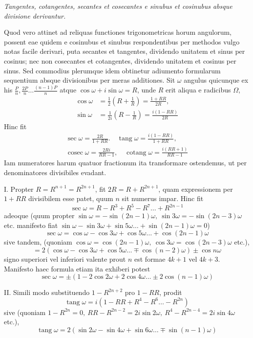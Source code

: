 \begin{center}\itshape \textit{Tangentes, cotangentes, secantes et cosecantes e sinubus et cosinubus absque divisione derivantur.}\end{center}


Quod vero attinet ad reliquas functiones trigonometricas horum angulorum, possent eae quidem e cosinubus et sinubus respondentibus per methodos vulgo notas facile derivari, puta secantes et tangentes, dividendo unitatem et sinus per cosinus; nec non cosecantes et cotangentes, dividendo unitatem et cosinus per sinus. Sed commodius plerumque idem obtinetur adiumento formularum sequentium absque divisionibus per meras additiones. Sit \(\omega\) angulus quicunque ex his \(\frac Pn,\allowbreak \frac{2P}n\ldots\frac{(n-1)P}n\) atque \(\cos\omega+i\sin\omega=R\), unde \(R\) erit aliqua e radicibus \(\Omega\), \[\begin{aligned}\cos\omega&=\tfrac12(R+\tfrac1R)=\frac{1+RR}{2R},\\\sin\omega&=\tfrac1{2i}(R-\tfrac1R)=\frac{i(1-RR)}{2R}\end{aligned}\] Hinc fit \[\begin{gathered}\sec\omega=\frac{2R}{1+RR}.\quad\operatorname{tang}\omega=\frac{i(1-RR)}{1+RR},\\\operatorname{cosec}\omega=\frac{2Ri}{RR-1},\quad\operatorname{cotang}\omega=\frac{i(RR+1)}{RR-1}\end{gathered}\] Iam numeratores harum quatuor fractionum ita transformare ostendemus, ut per denominatores divisibiles evadant.

I. Propter \(R=R^{n+1}=R^{2n+1}\), fit \(2R=R+R^{2n+1}\), quam expressionem per \(1+RR\) divisibilem esse patet, quum \(n\) sit numerus impar. Hinc fit \[\sec\omega=R-R^3+R^5-R^7\ldots+R^{2n-1}\] adeoque (quum propter \(\sin\omega=-\sin(2n-1)\omega,\allowbreak \ \sin3\omega=-\sin(2n-3)\omega\) etc. manifesto fiat \(\sin\omega-\sin3\omega+\sin5\omega\ldots+\sin(2n-1)\omega=0\)) \[\sec\omega=\cos\omega-\cos3\omega+\cos5\omega\ldots+\cos(2n-1)\omega\] sive tandem, (quoniam \(\cos\omega=\cos(2n-1)\omega,\allowbreak \ \cos3\omega=\cos(2n-3)\omega\) etc.), \[=2(\cos\omega-\cos3\omega+\cos5\omega\ldots\mp\cos(n-2)\omega)\pm\cos n\omega\] signo superiori vel inferiori valente prout \(n\) est formae \(4k+1\) vel \(4k+3\). Manifesto haec formula etiam ita exhiberi potest \[\sec\omega=\pm(1-2\cos2\omega+2\cos4\omega\ldots\pm2\cos(n-1)\omega)\]

II. Simili modo substituendo \(1-R^{2n+2}\) pro \(1-RR\), prodit
\[\operatorname{tang}\omega=i(1-RR+R^4-R^6\ldots-R^{2n})\] sive (quoniam \(1-R^{2n}=0,\allowbreak \ RR-R^{2n-2}=2i\sin2\omega,\allowbreak \ R^4-R^{2n-4}=2i\sin4\omega\) etc.), \[\operatorname{tang}\omega=2(\sin2\omega-\sin4\omega+\sin6\omega\ldots\mp\sin(n-1)\omega)\]

